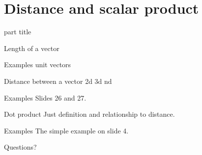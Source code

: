 \documentclass{beamer}
\begin{document}
\section{Distance and scalar product}

\begin{frame}
  \begin{beamercolorbox}[sep=12pt,center]{part title}
    \insertsection\par
  \end{beamercolorbox}
\end{frame}

\begin{frame}{Length of a vector}
  
\end{frame}

\begin{frame}{Examples}
  unit vectors
\end{frame}

\begin{frame}{Distance between a vector}
  2d 3d nd
\end{frame}

\begin{frame}{Examples}
  Slides 26 and 27.
\end{frame}

\begin{frame}{Dot product}
  Just definition and relationship to distance.
\end{frame}

\begin{frame}{Examples}
  The simple example on slide 4.
\end{frame}

\begin{frame}
  Questions?
\end{frame}
\end{document}
